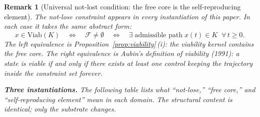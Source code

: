 \documentclass[11pt,a4paper]{article}
\newtheorem{remark}[theorem]{Remark}
\newcommand{\cF}{\mathcal{F}}
\begin{document}
\begin{remark}[Universal not-lost condition:
  the free core is the self-reproducing element]%
\label{rem:universal-not-lost}
\color{black!60}%
The not-lose constraint appears in every instantiation
of this paper.
In each case it takes the same abstract form:
\begin{equation}\label{eq:universal-not-lost}
  x \in \mathrm{Viab}(K)
  \quad\Longleftrightarrow\quad
  \cF \neq \emptyset
  \quad\Longleftrightarrow\quad
  \exists\;\text{admissible path}\;
  x(t) \in K \;\;\forall\, t \geq 0.
\end{equation}
The left equivalence is
Proposition~\ref{prop:viability}\,(i):
the viability kernel contains the free core.
The right equivalence is Aubin's definition of
viability (1991): a state is viable if and only if
there exists at least one control keeping
the trajectory inside the constraint set forever.

\medskip\noindent
\textbf{Three instantiations.}\;
The following table lists what ``not-lose,''
``free core,'' and ``self-reproducing element'' mean
in each domain.
The structural content is identical;
only the substrate changes.


\end{remark}
\end{document}
